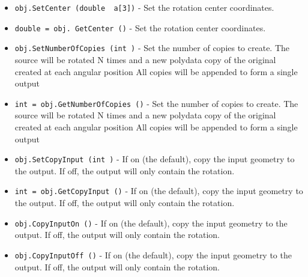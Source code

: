 \begin{itemize}
\item  \verb|obj.SetCenter (double  a[3])| -  Set the rotation center coordinates.

\item  \verb|double = obj. GetCenter ()| -  Set the rotation center coordinates.

\item  \verb|obj.SetNumberOfCopies (int )| -  Set the number of copies to create. The source will be rotated N times
 and a new polydata copy of the original created at each angular position
 All copies will be appended to form a single output

\item  \verb|int = obj.GetNumberOfCopies ()| -  Set the number of copies to create. The source will be rotated N times
 and a new polydata copy of the original created at each angular position
 All copies will be appended to form a single output

\item  \verb|obj.SetCopyInput (int )| -  If on (the default), copy the input geometry to the output. If off,
 the output will only contain the rotation.

\item  \verb|int = obj.GetCopyInput ()| -  If on (the default), copy the input geometry to the output. If off,
 the output will only contain the rotation.

\item  \verb|obj.CopyInputOn ()| -  If on (the default), copy the input geometry to the output. If off,
 the output will only contain the rotation.

\item  \verb|obj.CopyInputOff ()| -  If on (the default), copy the input geometry to the output. If off,
 the output will only contain the rotation.

\end{itemize}
